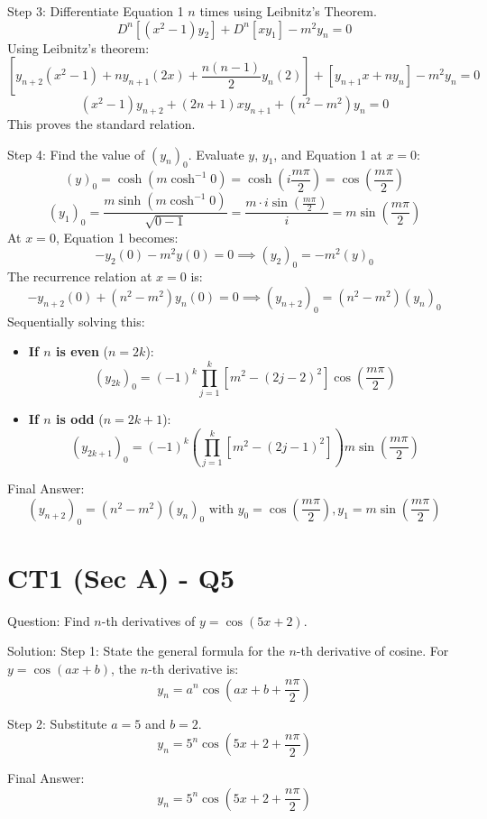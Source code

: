 \documentclass{article}
\begin{document}
Step 3: Differentiate Equation 1 $n$ times using Leibnitz's Theorem.
\[
D^n\left[ (x^2 - 1)y_2 \right] + D^n [x y_1] - m^2 y_n = 0
\]
Using Leibnitz's theorem:
\[
\left[ y_{n+2}(x^2 - 1) + n y_{n+1}(2x) + \frac{n(n-1)}{2} y_n(2) \right] + \left[ y_{n+1} x + n y_n \right] - m^2 y_n = 0
\]
\[
(x^2 - 1)y_{n+2} + (2n + 1)x y_{n+1} + (n^2 - m^2)y_n = 0
\]
This proves the standard relation.

Step 4: Find the value of $(y_n)_0$.
Evaluate $y$, $y_1$, and Equation 1 at $x = 0$:
\[
(y)_0 = \cosh(m \cosh^{-1} 0) = \cosh\left(i \frac{m\pi}{2}\right) = \cos\left(\frac{m\pi}{2}\right)
\]
\[
(y_1)_0 = \frac{m \sinh(m \cosh^{-1} 0)}{\sqrt{0 - 1}} = \frac{m \cdot i \sin\left(\frac{m\pi}{2}\right)}{i} = m \sin\left(\frac{m\pi}{2}\right)
\]
At $x = 0$, Equation 1 becomes:
\[
-y_2(0) - m^2 y(0) = 0 \implies (y_2)_0 = -m^2 (y)_0
\]
The recurrence relation at $x = 0$ is:
\[
-y_{n+2}(0) + (n^2 - m^2)y_n(0) = 0 \implies (y_{n+2})_0 = (n^2 - m^2)(y_n)_0
\]
Sequentially solving this:
\begin{itemize}
    \item \textbf{If $n$ is even} ($n = 2k$):
    \[
    (y_{2k})_0 = (-1)^k \prod_{j=1}^k \left[ m^2 - (2j-2)^2 \right] \cos\left(\frac{m\pi}{2}\right)
    \]
    \item \textbf{If $n$ is odd} ($n = 2k+1$):
    \[
    (y_{2k+1})_0 = (-1)^k \left( \prod_{j=1}^k \left[ m^2 - (2j-1)^2 \right] \right) m \sin\left(\frac{m\pi}{2}\right)
    \]
\end{itemize}

Final Answer:
\[
\boxed{(y_{n+2})_0 = (n^2 - m^2)(y_n)_0 \text{ with } y_0 = \cos\left(\frac{m\pi}{2}\right), y_1 = m \sin\left(\frac{m\pi}{2}\right)}
\]

\section*{CT1 (Sec A) - Q5}
Question:
Find $n$-th derivatives of $y = \cos(5x + 2)$.

Solution:
Step 1: State the general formula for the $n$-th derivative of cosine.
For $y = \cos(ax + b)$, the $n$-th derivative is:
\[
y_n = a^n \cos\left( ax + b + \frac{n\pi}{2} \right)
\]

Step 2: Substitute $a = 5$ and $b = 2$.
\[
y_n = 5^n \cos\left( 5x + 2 + \frac{n\pi}{2} \right)
\]

Final Answer:
\[
\boxed{y_n = 5^n \cos\left( 5x + 2 + \frac{n\pi}{2} \right)}
\]
\end{document}
